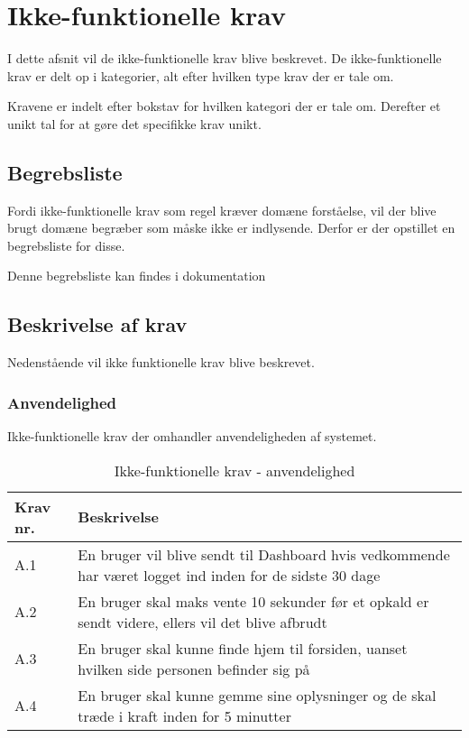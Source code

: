 \chapter{Ikke-funktionelle krav}

I dette afsnit vil de ikke-funktionelle krav blive beskrevet. De ikke-funktionelle krav er delt op i kategorier, alt efter hvilken type krav der er tale om.

Kravene er indelt efter bokstav for hvilken kategori der er tale om. Derefter et unikt tal for at gøre det specifikke krav unikt.

\section{Begrebsliste}

Fordi ikke-funktionelle krav som regel kræver domæne forståelse, vil der blive brugt domæne begræber som måske ikke er indlysende. Derfor er der opstillet en begrebsliste for disse.

Denne begrebsliste kan findes i dokumentation \cite{terms}

\section{Beskrivelse af krav}

Nedenstående vil ikke funktionelle krav blive beskrevet.

\subsection{Anvendelighed}

Ikke-funktionelle krav der omhandler anvendeligheden af systemet.

\begin{table}[H]
    \centering
    \caption{Ikke-funktionelle krav - anvendelighed}
    \label{tab:if-useability}
    \begin{tabular}{p{1cm}|p{8cm}}
        \textbf{Krav nr.} & \textbf{Beskrivelse}                                                                                                               \\\hline
        A.1               & \multicolumn{1}{p{8cm}}{En bruger vil blive sendt til Dashboard hvis vedkommende har været logget ind inden for de sidste 30 dage} \\\hline
        A.2               & \multicolumn{1}{p{8cm}}{En bruger skal maks vente 10 sekunder før et opkald er sendt videre, ellers vil det blive afbrudt}         \\\hline
        A.3               & \multicolumn{1}{p{8cm}}{En bruger skal kunne finde hjem til forsiden, uanset hvilken side personen befinder sig på}                \\\hline
        A.4               & \multicolumn{1}{p{8cm}}{En bruger skal kunne gemme sine oplysninger og de skal træde i kraft inden for 5 minutter}                 \\\hline
    \end{tabular}
\end{table}


